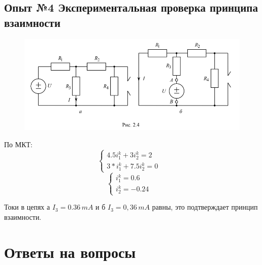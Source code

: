 \documentclass[a4paper,12pt]{report}
\begin{document}
\begin{flushleft}
	\newpage
	\item\subsection*{Опыт №4 Экспериментальная проверка принципа взаимности}
	\item \item \begin{figure}[h!]
        \includegraphics[width=1.1\textwidth]{scheme_4.png}
        \label{ris:image4}
    \end{figure}
    По МКТ: 
    \[\begin{cases}
        4.5i_1^k + 3i_2^k = 2 &
      \\
        3*i_1^k + 7.5i_2^k = 0 &
    \end{cases}\]
    \[\begin{cases}
    i_1^k = 0.6 &
      \\
    i_2^k  = -0.24 &
    \end{cases}\]
     
Токи в цепях а $I_3 = 0.36 \, mA $ и б $I_3=0,36\, mA$ равны, это подтверждает принцип взаимности.

\end{flushleft}
\newpage

\section*{Ответы на вопросы}
\end{document}

